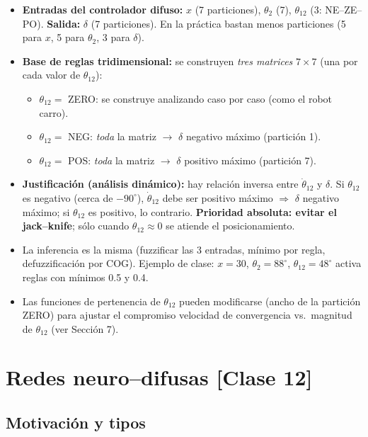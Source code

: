 \documentclass[11pt,a4paper]{article}
\newcommand{\grados}{^{\circ}}
\begin{document}
\begin{itemize}[itemsep=1pt]
\item \textbf{Entradas del controlador difuso:} $x$ (7 particiones), $\theta_2$ (7), $\theta_{12}$ (3: NE--ZE--PO). \textbf{Salida:} $\delta$ (7 particiones). En la práctica bastan menos particiones (5 para $x$, 5 para $\theta_2$, 3 para $\delta$).
\item \textbf{Base de reglas tridimensional:} se construyen \emph{tres matrices} $7\times7$ (una por cada valor de $\theta_{12}$):
  \begin{itemize}[itemsep=0pt]
  \item $\theta_{12}=$ ZERO: se construye analizando caso por caso (como el robot carro).
  \item $\theta_{12}=$ NEG: \emph{toda} la matriz $\to$ $\delta$ negativo máximo (partición 1).
  \item $\theta_{12}=$ POS: \emph{toda} la matriz $\to$ $\delta$ positivo máximo (partición 7).
  \end{itemize}
\item \textbf{Justificación (análisis dinámico):} hay relación inversa entre $\dot\theta_{12}$ y $\delta$. Si $\theta_{12}$ es negativo (cerca de $-90\grados$), $\dot\theta_{12}$ debe ser positivo máximo $\Rightarrow$ $\delta$ negativo máximo; si $\theta_{12}$ es positivo, lo contrario. \textbf{Prioridad absoluta: evitar el jack--knife}; sólo cuando $\theta_{12}\approx0$ se atiende el posicionamiento.
\item La inferencia es la misma (fuzzificar las 3 entradas, mínimo por regla, defuzzificación por COG). Ejemplo de clase: $x=30$, $\theta_2=88\grados$, $\theta_{12}=48\grados$ activa reglas con mínimos 0.5 y 0.4.
\item Las funciones de pertenencia de $\theta_{12}$ pueden modificarse (ancho de la partición ZERO) para ajustar el compromiso velocidad de convergencia vs.\ magnitud de $\theta_{12}$ (ver Sección 7).
\end{itemize}

\section{Redes neuro--difusas \hfill {\normalsize [Clase 12]}}

\subsection{Motivación y tipos}
\end{document}
